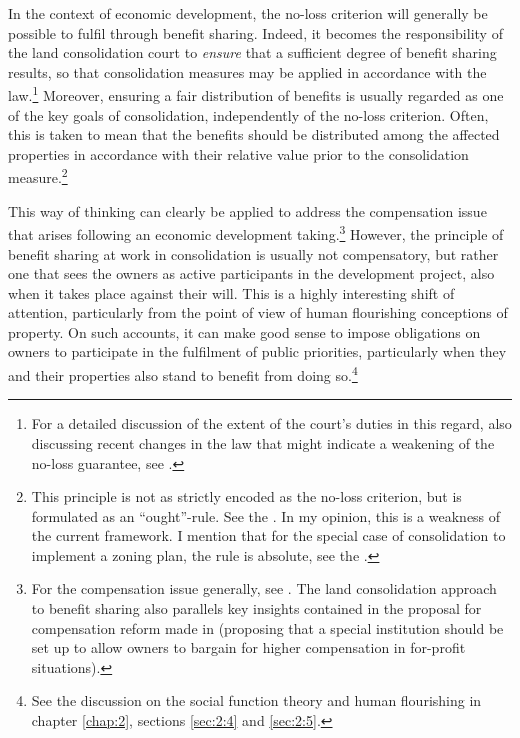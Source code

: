 
In the context of economic development, the no-loss criterion will generally be possible to fulfil  through benefit sharing. Indeed, it becomes the responsibility of the land consolidation court to {\it ensure} that a sufficient degree of benefit sharing results, so that consolidation measures may be applied in accordance with the law.\footnote{For a detailed discussion of the extent of the court's duties in this regard, also discussing recent changes in the law that might indicate a weakening of the no-loss guarantee, see \cite{hauge15}.} Moreover, ensuring a fair distribution of benefits is usually regarded as one of the key goals of consolidation, independently of the no-loss criterion. Often, this is taken to mean that the benefits should be distributed among the affected properties in accordance with their relative value prior to the consolidation measure.\footnote{This principle is not as strictly encoded as the no-loss criterion, but is formulated as an ``ought''-rule. See the \dni\cite[31|41]{lca79}. In my opinion, this is a weakness of the current framework. I mention that for the special case of consolidation to implement a zoning plan, the rule is absolute, see the \dni\cite[3 b)]{lca79}.}

This way of thinking can clearly be applied to address the compensation issue that arises following an  economic development taking.\footnote{For the compensation issue generally, see \cite{fennell04,bell07}. The land consolidation approach to benefit sharing also parallels key insights contained in the proposal for compensation reform made in \cite{lehavi07} (proposing that a special institution should be set up to allow owners to bargain for higher compensation in for-profit situations).} However, the principle of benefit sharing at work in consolidation is usually not compensatory, but rather one that sees the owners as active participants in the development project, also when it takes place against their will. This is a highly interesting shift of attention, particularly from the point of view of human flourishing conceptions of property. On such accounts, it can make good sense to impose obligations on owners to participate in the fulfilment of public priorities, particularly when they and their properties also stand to benefit from doing so.\footnote{See the discussion on the social function theory and human flourishing in chapter \ref{chap:2}, sections \ref{sec:2:4} and \ref{sec:2:5}.}

